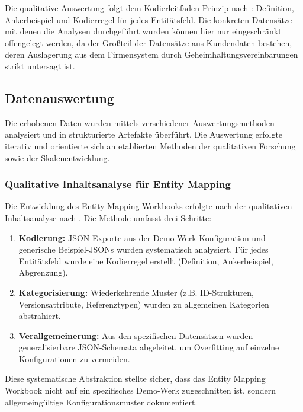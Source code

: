 Die qualitative Auswertung folgt dem Kodierleitfaden-Prinzip nach \cite{mayring:qualitative2015}: Definition, Ankerbeispiel und Kodierregel für jedes Entitätsfeld. Die konkreten Datensätze mit denen die Analysen durchgeführt wurden können hier nur eingeschränkt offengelegt werden, da der Großteil der Datensätze aus Kundendaten bestehen, deren Auslagerung aus dem Firmensystem durch Geheimhaltungsvereinbarungen strikt untersagt ist.


\subsection{Datenauswertung}
\label{subsec:Datenauswertung}

Die erhobenen Daten wurden mittels verschiedener Auswertungsmethoden analysiert und in strukturierte Artefakte überführt. Die Auswertung erfolgte iterativ und orientierte sich an etablierten Methoden der qualitativen Forschung sowie der Skalenentwicklung.

\subsubsection{Qualitative Inhaltsanalyse für Entity Mapping}
\label{subsubsec:QualitativeInhaltsanalyse}

Die Entwicklung des Entity Mapping Workbooks erfolgte nach der qualitativen Inhaltsanalyse nach \cite{mayring:qualitative2015}. Die Methode umfasst drei Schritte:

\begin{enumerate}
    \item \textbf{Kodierung:} JSON-Exporte aus der Demo-Werk-Konfiguration und generische Beispiel-JSONs wurden systematisch analysiert. Für jedes Entitätsfeld wurde eine Kodierregel erstellt (Definition, Ankerbeispiel, Abgrenzung).

    \item \textbf{Kategorisierung:} Wiederkehrende Muster (z.B. ID-Strukturen, Versionsattribute, Referenztypen) wurden zu allgemeinen Kategorien abstrahiert.

    \item \textbf{Verallgemeinerung:} Aus den spezifischen Datensätzen wurden generalisierbare JSON-Schemata abgeleitet, um Overfitting auf einzelne Konfigurationen zu vermeiden.
\end{enumerate}

Diese systematische Abstraktion stellte sicher, dass das Entity Mapping Workbook nicht auf ein spezifisches Demo-Werk zugeschnitten ist, sondern allgemeingültige Konfigurationsmuster dokumentiert.

